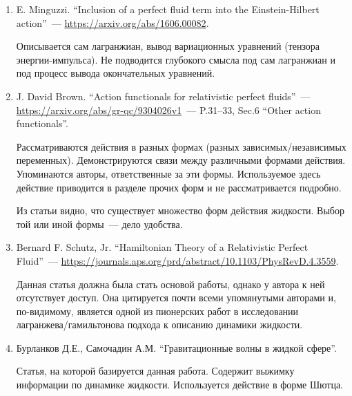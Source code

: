 \documentclass[\docroot/reports/draft/report.tex]{subfiles}
\begin{document}
    \begin{enumerate}
        \item E. Minguzzi. \enquote{Inclusion of a perfect fluid term into the Einstein-Hilbert action}~--- \url{https://arxiv.org/abs/1606.00082}.

        Описывается сам лагранжиан, вывод вариационных уравнений (тензора энергии-импульса). Не подводится глубокого смысла под сам лагранжиан и под процесс вывода окончательных уравнений.

        \item J. David Brown. \enquote{Action functionals for relativistic perfect fluids}~--- \url{https://arxiv.org/abs/gr-qc/9304026v1}~--- P.31--33, Sec.6 \enquote{Other action functionals}.

        Рассматриваются действия в разных формах (разных зависимых/независимых переменных). Демонстрируются связи между различными формами действия. Упоминаются авторы, ответственные за эти формы. Используемое здесь действие приводится в разделе прочих форм и не рассматривается подробно.

        Из статьи видно, что существует множество форм действия жидкости. Выбор той или иной формы~--- дело удобства.

        \item Bernard F. Schutz, Jr. \enquote{Hamiltonian Theory of a Relativistic Perfect Fluid}~--- \url{https://journals.aps.org/prd/abstract/10.1103/PhysRevD.4.3559}.

        Данная статья должна была стать основой работы, однако у автора к ней отсутствует доступ. Она цитируется почти всеми упомянутыми авторами и, по-видимому, является одной из пионерских работ в исследовании лагранжева/гамильтонова подхода к описанию динамики жидкости.

        \item Бурланков Д.Е., Самочадин А.М. \enquote{Гравитационные волны в жидкой сфере}.

        Статья, на которой базируется данная работа. Содержит выжимку информации по динамике жидкости. Используется действие в форме Шютца.
    \end{enumerate}

\end{document}
